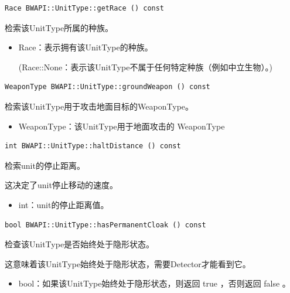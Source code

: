 \begin{tcolorbox}[colback=white, colframe=black!60!white, title=getRace(), arc=0mm]
    \begin{verbatim}
Race BWAPI::UnitType::getRace () const
    \end{verbatim}
    检索该UnitType所属的种族。
\begin{return}
\begin{itemize}
    \item Race：表示拥有该UnitType的种族。\par (Race::None：表示该UnitType不属于任何特定种族（例如中立生物）。)
\end{itemize}
\end{return}
\end{tcolorbox}


\begin{tcolorbox}[colback=white, colframe=black!60!white, title=groundWeapon(), arc=0mm]
    \begin{verbatim}
WeaponType BWAPI::UnitType::groundWeapon () const
    \end{verbatim}
    检索该UnitType用于攻击地面目标的WeaponType。
\begin{return}
\begin{itemize}
    \item WeaponType：该UnitType用于地面攻击的   WeaponType 
\end{itemize}
\end{return}
\end{tcolorbox}


\begin{tcolorbox}[colback=white, colframe=black!60!white, title=haltDistance(), arc=0mm]
    \begin{verbatim}
int BWAPI::UnitType::haltDistance () const
    \end{verbatim}
    检索unit的停止距离。\par 这决定了unit停止移动的速度。
\begin{return}
\begin{itemize}
    \item int：unit的停止距离值。
\end{itemize}
\end{return}
\end{tcolorbox}


\begin{tcolorbox}[colback=white, colframe=black!60!white, title=hasPermanentCloak(), arc=0mm]
    \begin{verbatim}
bool BWAPI::UnitType::hasPermanentCloak () const
    \end{verbatim}
    检查该UnitType是否始终处于隐形状态。\par 这意味着该UnitType始终处于隐形状态，需要Detector才能看到它。
\begin{return}
\begin{itemize}
    \item bool：如果该UnitType始终处于隐形状态，则返回   true  ，否则返回   false  。
\end{itemize}
\end{return}
\end{tcolorbox}


